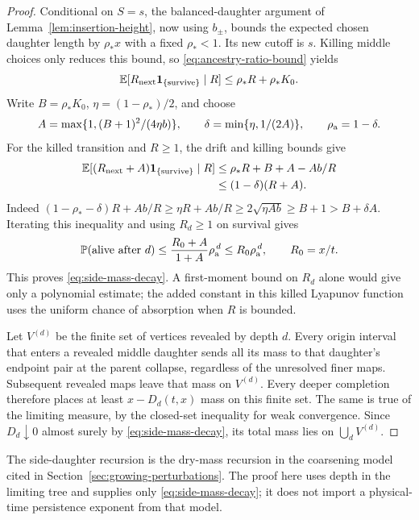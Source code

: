 \documentclass[11pt,letterpaper]{article}
\newcommand{\PP}{\mathbb P}\newcommand{\EE}{\mathbb E}
\newcommand{\ind}{\mathbf 1}\newcommand{\Exp}{\operatorname{Exp}}
\begin{document}
\begin{proof}
Conditional on $S=s$, the balanced-daughter argument of
Lemma~\ref{lem:insertion-height}, now using $b_\pm$, bounds the
expected chosen daughter length by $\rho_*x$ with a fixed
$\rho_*<1$. Its new cutoff is $s$. Killing middle choices only
reduces this bound, so \eqref{eq:ancestry-ratio-bound} yields
\[
 \EE[R_{\rm next}\ind_{\{\rm survive\}}\mid R]
      \le\rho_*R+\rho_*K_0.
\]
Write $B=\rho_*K_0$, $\eta=(1-\rho_*)/2$, and choose
\[
 A=\max\{1,(B+1)^2/(4\eta b)\},\qquad
 \delta=\min\{\eta,1/(2A)\},\qquad \rho_{\rm a}=1-\delta.
\]
For the killed transition and $R\ge1$, the drift and killing bounds give
\begin{align*}
 \EE[(R_{\rm next}+A)\ind_{\{\rm survive\}}\mid R]
 &\le\rho_*R+B+A-Ab/R\\
 &\le(1-\delta)(R+A).
\end{align*}
Indeed $(1-\rho_*-\delta)R+Ab/R
\ge\eta R+Ab/R\ge2\sqrt{\eta Ab}\ge B+1>B+\delta A$.
Iterating this inequality and using $R_d\ge1$ on survival gives
\[
 \PP(\hbox{alive after }d)
 \le\frac{R_0+A}{1+A}\rho_{\rm a}^{\,d}
 \le R_0\rho_{\rm a}^{\,d},\qquad R_0=x/t.
\]
This proves \eqref{eq:side-mass-decay}. A first-moment bound on
$R_d$ alone would give only a polynomial estimate; the added constant
in this killed Lyapunov function uses the uniform chance of absorption
when $R$ is bounded.

Let $V^{(d)}$ be the finite set of vertices revealed by depth $d$.
Every origin interval that enters a revealed middle daughter sends
all its mass to that daughter's endpoint pair at the parent
collapse, regardless of the unresolved finer maps.
Subsequent revealed maps leave that mass on $V^{(d)}$.
Every deeper completion therefore places at least $x-D_d(t,x)$
mass on this finite set. The same is true of the limiting measure,
by the closed-set inequality for weak convergence.
Since $D_d\downarrow0$ almost surely by
\eqref{eq:side-mass-decay}, its total mass lies on
$\bigcup_d V^{(d)}$.
\end{proof}

The side-daughter recursion is the dry-mass recursion in the
coarsening model cited in Section~\ref{sec:growing-perturbations}.
The proof here uses depth in the limiting tree and supplies only
\eqref{eq:side-mass-decay}; it does not import a physical-time
persistence exponent from that model.
\end{document}
